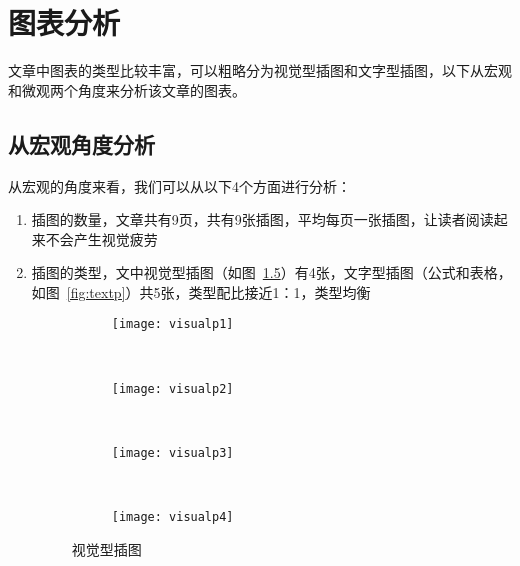 \chapter{图表分析}\label{chap:figtbl}
文章中图表的类型比较丰富，可以粗略分为视觉型插图和文字型插图，以下从宏观和微观两个角度来分析该文章的图表。

\section{从宏观角度分析}
从宏观的角度来看，我们可以从以下4个方面进行分析：
\begin{enumerate}
\item
插图的数量，文章共有9页，共有9张插图，平均每页一张插图，让读者阅读起来不会产生视觉疲劳
\item
插图的类型，文中视觉型插图（如图~\ref{fig:visualp}）有4张，文字型插图（公式和表格，如图~\ref{fig:textp}）共5张，类型配比接近1：1，类型均衡
\begin{figure}[!htbp]
    \centering
    \begin{subfigure}[b]{0.35\textwidth}
      \texttt{[image: visualp1]}
      \caption{}
      \label{fig:oaspl_a}
    \end{subfigure}%
    ~%
    \begin{subfigure}[b]{0.35\textwidth}
      \texttt{[image: visualp2]}
      \caption{}
      \label{fig:oaspl_b}
    \end{subfigure}
    \\%
    \begin{subfigure}[b]{0.35\textwidth}
      \texttt{[image: visualp3]}
      \caption{}
      \label{fig:oaspl_c}
    \end{subfigure}%
    ~%
    \begin{subfigure}[b]{0.35\textwidth}
      \texttt{[image: visualp4]}
      \caption{}
      \label{fig:oaspl_d}
    \end{subfigure}
    \caption{视觉型插图}
    \label{fig:visualp}
\end{figure}


\end{enumerate}
